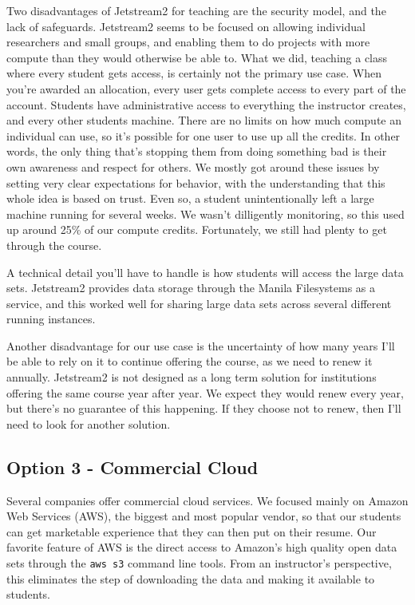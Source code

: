 \documentclass[12pt]{article}
\begin{document}
Two disadvantages of Jetstream2 for teaching are the security model, and the lack of safeguards.
Jetstream2 seems to be focused on allowing individual researchers and small groups, and enabling them to do projects with more compute than they would otherwise be able to.
What we did, teaching a class where every student gets access, is certainly not the primary use case.
When you're awarded an allocation, every user gets complete access to every part of the account.
Students have administrative access to everything the instructor creates, and every other students machine.
There are no limits on how much compute an individual can use, so it's possible for one user to use up all the credits.
In other words, the only thing that's stopping them from doing something bad is their own awareness and respect for others.
We mostly got around these issues by setting very clear expectations for behavior, with the understanding that this whole idea is based on trust.
Even so, a student unintentionally left a large machine running for several weeks.
We wasn't dilligently monitoring, so this used up around 25\% of our compute credits.
Fortunately, we still had plenty to get through the course.

A technical detail you'll have to handle is how students will access the large data sets.
Jetstream2 provides data storage through the Manila Filesystems as a service, and this worked well for sharing large data sets across several different running instances.

Another disadvantage for our use case is the uncertainty of how many years I'll be able to rely on it to continue offering the course, as we need to renew it annually.
Jetstream2 is not designed as a long term solution for institutions offering the same course year after year. 
We expect they would renew every year, but there's no guarantee of this happening.
If they choose not to renew, then I'll need to look for another solution.

\subsection{Option 3 - Commercial Cloud}

Several companies offer commercial cloud services.
We focused mainly on Amazon Web Services (AWS), the biggest and most popular vendor, so that our students can get marketable experience that they can then put on their resume.
Our favorite feature of AWS is the direct access to Amazon's high quality open data sets through the \texttt{aws s3} command line tools.
From an instructor's perspective, this eliminates the step of downloading the data and making it available to students.
\end{document}
